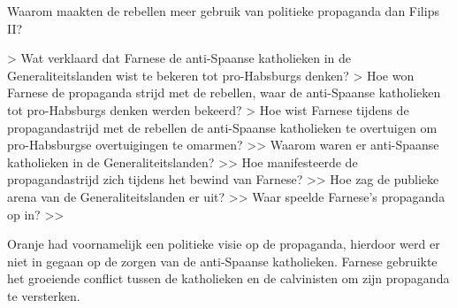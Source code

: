 \documentclass[11pt]{amsart}
\begin{document}






Waarom maakten de rebellen meer gebruik van politieke propaganda dan Filips II?

> Wat verklaard dat Farnese de anti-Spaanse katholieken in de Generaliteitslanden wist te bekeren tot pro-Habsburgs denken?
> Hoe won Farnese de propaganda strijd met de rebellen, waar de anti-Spaanse katholieken tot pro-Habsburgs denken werden bekeerd?
> Hoe wist Farnese tijdens de propagandastrijd met de rebellen de anti-Spaanse katholieken te overtuigen om pro-Habsburgse overtuigingen te omarmen?
>> Waarom waren er anti-Spaanse katholieken in de Generaliteitslanden?
>> Hoe manifesteerde de propagandastrijd zich tijdens het bewind van Farnese?
>> Hoe zag de publieke arena van de Generaliteitslanden er uit?
>> Waar speelde Farnese's propaganda op in?
>>

Oranje had voornamelijk een politieke visie op de propaganda, hierdoor werd er niet in gegaan op de zorgen van de
anti-Spaanse katholieken. Farnese gebruikte het groeiende conflict tussen de katholieken en de calvinisten om zijn
propaganda te versterken.
\end{document}
